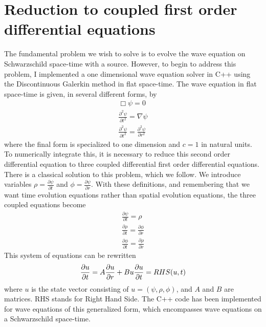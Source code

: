 \section{Reduction to coupled first order differential equations}


The fundamental problem we wish to solve is to evolve the wave equation on Schwarzschild space-time with a source. However, to begin to address this problem, I implemented a one dimensional wave equation solver in C++ using the Discontinuous Galerkin method in flat space-time. The wave equation in flat space-time is given, in several different forms, by
\begin{eqnarray}
  \Box\psi=0\\
  \frac{\partial^2\psi}{\partial t^2}=\nabla\psi\\
  \frac{\partial^2\psi}{\partial t^2}=\frac{\partial^2 \psi}{\partial r^2}
\end{eqnarray}
where the final form is specialized to one dimension and $c=1$ in natural units. To numerically integrate this, it is necessary to reduce this second order differential equation to three coupled differential first order differential equations. There is a classical solution to this problem, which we follow. We introduce variables $\rho=\frac{\partial \psi}{\partial t}$ and $\phi = \frac{\partial\psi}{\partial r}$. With these definitions, and remembering that we want time evolution equations rather than spatial evolution equations, the three coupled equations become
\begin{eqnarray}
  \frac{\partial\psi}{\partial t} = \rho\nonumber\\
  \frac{\partial\rho}{\partial t} = \frac{\partial \phi}{\partial r}\nonumber\\
  \frac{\partial\phi}{\partial t} = \frac{\partial \rho}{\partial r}
  \label{stateev}
\end{eqnarray}
This system of equations can be rewritten
\begin{equation}
  \frac{\partial u}{\partial t} = A\frac{\partial u}{\partial r} + Bu\nonumber\\
  \frac{\partial u}{\partial t} = RHS(u,t)
  \label{matrixdiff}
\end{equation}
where $u$ is the state vector consisting of $u=(\psi,\rho,\phi)$, and $A$ and $B$ are matrices. RHS stands for Right Hand Side. The C++ code has been implemented for wave equations of this generalized form, which encompasses wave equations on a Schwarzschild space-time.




